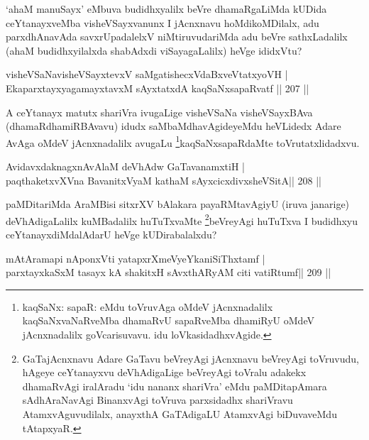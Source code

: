 \begin{artha}
`ahaM manuSayx' eMbuva budidhxyalilx beVre dhamaRgaLiMda kUDida ceYtanayxveMba visheVSayxvanunx I jAcnxnavu hoMdikoMDilalx, adu parxdhAnavAda savxrUpadalelxV niMtiruvudariMda adu beVre sathxLadalilx (ahaM budidhxyilalxda shabAdxdi viSayagaLalilx) heVge ididxVtu?
\end{artha}


\begin{shl}
visheVSaNavisheVSayxtevxV saMgatishecxVdaBxveVtatxyoVH | \\
EkaparxtayxyagamayxtavxM sAyxtatxdA kaqSaNxsapaRvatf \hfill ||  207 ||  
\end{shl}

\begin{artha}
A ceYtanayx matutx shariVra ivugaLige visheVSaNa visheVSayxBAva (dhamaRdhamiRBAvavu) idudx saMbaMdhavAgideyeMdu heVLidedx Adare AvAga oMdeV jAcnxnadalilx avugaLu \footnote{kaqSaNx: sapaR: eMdu toVruvAga oMdeV jAcnxnadalilx kaqSaNxvaNaRveMba dhamaRvU sapaRveMba dhamiRyU oMdeV jAcnxnadalilx goVcarisuvavu. idu loVkasidadhxvAgide.}kaqSaNxsapaRdaMte toVrutatxlidadxvu. 
\end{artha}

\begin{shl}
AvidavxdaknagxnAvAlaM deVhAdw GaTavanamxtiH | \\
paqthaketxvXVna BavanitxVyaM kathaM sAyxcicxdivxsheVSitA\hfill  ||  208 ||  
\end{shl} 

\begin{artha}
paMDitariMda AraMBisi sitxrXV bAlakara payaRMtavAgiyU (iruva janarige) deVhAdigaLalilx kuMBadalilx huTuTxvaMte \footnote{GaTajAcnxnavu Adare GaTavu beVreyAgi jAcnxnavu beVreyAgi toVruvudu, hAgeye ceYtanayxvu deVhAdigaLige beVreyAgi toVralu adakekx dhamaRvAgi iralAradu `idu nananx shariVra' eMdu paMDitapAmara sAdhAraNavAgi BinanxvAgi toVruva parxsidadhx shariVravu AtamxvAguvudilalx, anayxthA GaTAdigaLU AtamxvAgi biDuvaveMdu tAtapxyaR.}beVreyAgi huTuTxva I budidhxyu ceYtanayxdiMdalAdarU heVge kUDirabalalxdu?
\end{artha}

\begin{shl}
mAtAramapi nA\s \s ponxVti yatapxrXmeVyeYkaniSiThxtamf | \\
parxtayxkaSxM tasayx kA shakitxH sAvxthARyAM citi vatiRtumf\hfill  ||  209 ||  
\end{shl}


